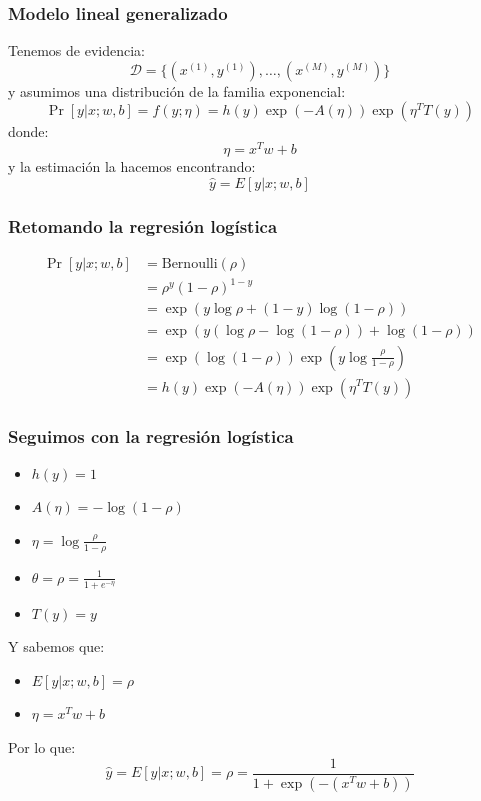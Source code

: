 \documentclass{beamer}
\begin{document}
\begin{frame}
  \frametitle{Modelo lineal generalizado}

  Tenemos de evidencia:
  $$  
  \mathcal{D} = \{(x^{(1)}, y^{(1)}), \ldots, (x^{(M)}, y^{(M)})\} 
  $$ 
  y asumimos una distribución de la familia exponencial:
  $$
  \Pr[y | x; w, b] = f(y; \eta) = h(y) \exp(-A(\eta)) \exp(\eta^T T(y))
  $$
  donde:
  $$
  \eta = x^T w + b
  $$
  y la estimación la hacemos encontrando:
  $$
  \hat{y} = E[y | x; w, b]
  $$
\end{frame}

\begin{frame}
  \frametitle{Retomando la regresión logística}

  \begin{align*}
    \Pr[y | x; w, b] &= \text{Bernoulli}(\rho) \\
    &= \rho^{y} (1 - \rho)^{1 - y} \\
    &= \exp(y \log \rho + (1 - y) \log (1 - \rho)) \\
    &= \exp(y (\log \rho - \log (1 - \rho)) + \log (1 - \rho)) \\
    &= \exp(\log (1 - \rho)) \exp(y \log \frac{\rho}{1 - \rho}) \\
    &= h(y) \exp(-A(\eta)) \exp(\eta^T T(y))
  \end{align*}

\end{frame}

\begin{frame}
  \frametitle{Seguimos con la regresión logística}

  \begin{itemize}
    \item $h(y) = 1$
    \item $A(\eta) = -\log (1 - \rho)$
    \item $\eta = \log \frac{\rho}{1 - \rho}$
    \item $\theta = \rho = \frac{1}{1 + e^{-\eta}}$
    \item $T(y) = y$
  \end{itemize}

  Y sabemos que:
  \begin{itemize}
    \item $E[y | x; w, b] = \rho$
    \item $\eta = x^T w + b$
  \end{itemize}

  Por lo que:
  $$
  \hat{y} = E[y | x; w, b] = \rho = \frac{1}{1 + \exp(-(x^T w + b))}
  $$
\end{frame}
\end{document}
